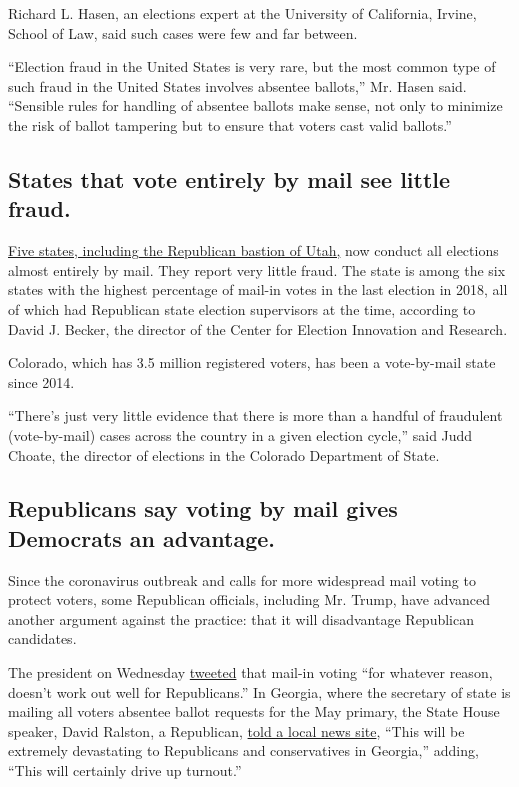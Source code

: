 Richard L. Hasen, an elections expert at the University of California,
Irvine, School of Law, said such cases were few and far between.

``Election fraud in the United States is very rare, but the most common
type of such fraud in the United States involves absentee ballots,'' Mr.
Hasen said. ``Sensible rules for handling of absentee ballots make
sense, not only to minimize the risk of ballot tampering but to ensure
that voters cast valid ballots.''

\hypertarget{states-that-vote-entirely-by-mail-see-little-fraud}{%
\subsection{States that vote entirely by mail see little
fraud.}\label{states-that-vote-entirely-by-mail-see-little-fraud}}

\href{https://www.ncsl.org/research/elections-and-campaigns/all-mail-elections.aspx}{Five
states, including the Republican bastion of Utah,} now conduct all
elections almost entirely by mail. They report very little fraud. The
state is among the six states with the highest percentage of mail-in
votes in the last election in 2018, all of which had Republican state
election supervisors at the time, according to David J. Becker, the
director of the Center for Election Innovation and Research.

Colorado, which has 3.5 million registered voters, has been a
vote-by-mail state since 2014.

``There's just very little evidence that there is more than a handful of
fraudulent (vote-by-mail) cases across the country in a given election
cycle,'' said Judd Choate, the director of elections in the Colorado
Department of State.

\hypertarget{republicans-say-voting-by-mail-gives-democrats-an-advantage}{%
\subsection{Republicans say voting by mail gives Democrats an
advantage.}\label{republicans-say-voting-by-mail-gives-democrats-an-advantage}}

Since the coronavirus outbreak and calls for more widespread mail voting
to protect voters, some Republican officials, including Mr. Trump, have
advanced another argument against the practice: that it will
disadvantage Republican candidates.

The president on Wednesday
\href{https://twitter.com/realDonaldTrump/status/1247861952736526336}{tweeted}
that mail-in voting ``for whatever reason, doesn't work out well for
Republicans.'' In Georgia, where the secretary of state is mailing all
voters absentee ballot requests for the May primary, the State House
speaker, David Ralston, a Republican,
\href{https://www.ajc.com/news/state--regional-govt--politics/pressure-mounts-for-further-delay-georgia-may-primary-election/K1wboFdcY1z7xYt7pa11MO/}{told
a local news site}, ``This will be extremely devastating to Republicans
and conservatives in Georgia,'' adding, ``This will certainly drive up
turnout.''

